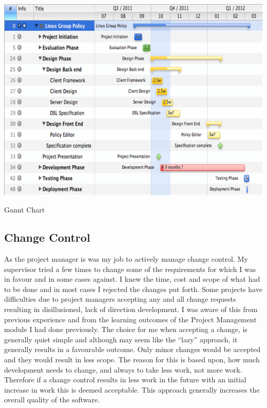 		
	\begin{figurehere}
		\centering
		\includegraphics[scale=0.9]{pages/chapter4/figures/timeline.png}
		\caption{Gannt Chart}
		\label{fig:GanntChart}
	\end{figurehere}		
	
\newpage
	
	\subsection{Change Control}
	
		\normalsize
		{
			As the project manager is was my job to actively manage change control.  My supervisor
			tried a few times to change some of the requirements for which I was in favour and in some cases against.
			I knew the time, cost and scope of what had to be done and in most cases I rejected the changes put forth.
			\newline
			\newline
			Some projects have difficulties due to project managers accepting any and all change requests
			resulting in disillusioned, lack of direction development.  I was aware of this from previous experience
			and from the learning outcomes of the Project Management module I had done previously.
			\newline
			\newline
			The choice for me when accepting a change, is generally quiet simple and although may seem like the ``lazy''
			approach, it generally results in a favourable outcome.  Only minor changes would be accepted and they would result 
			in less scope.  The reason for this is based upon, how much development needs to change, and always to take less work,
			not more work.  Therefore if a change control results in less work in the future with an initial increase in work
			this is deemed acceptable.  This approach generally increases the overall quality of the software.
		}
	
